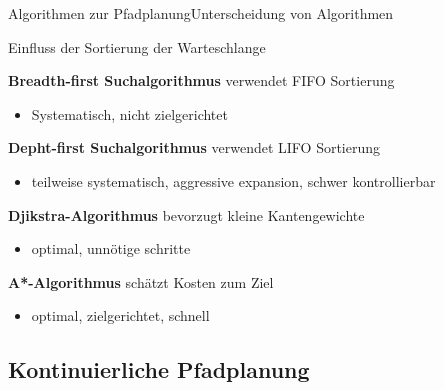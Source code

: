 \documentclass[t,aspectratio=169,dvipsnames]{beamer}
\begin{document}
\begin{frame}{Algorithmen zur Pfadplanung}{Unterscheidung von Algorithmen}
	
	\begin{center}
		Einfluss der Sortierung der Warteschlange
	\end{center}
	
	\textbf{Breadth-first Suchalgorithmus} verwendet FIFO Sortierung
	\begin{itemize}
		\item Systematisch, nicht zielgerichtet	
	\end{itemize}
	\textbf{Depht-first Suchalgorithmus} verwendet LIFO Sortierung
	\begin{itemize}
	\item teilweise systematisch, aggressive expansion, schwer kontrollierbar	
	\end{itemize}
	\textbf{Djikstra-Algorithmus} bevorzugt kleine Kantengewichte
	\begin{itemize}
		\item optimal, unnötige schritte
	\end{itemize}
	\textbf{A*-Algorithmus} schätzt Kosten zum Ziel
	\begin{itemize}
		\item optimal, zielgerichtet, schnell
	\end{itemize}	
\end{frame}

\subsection{Kontinuierliche Pfadplanung}
\end{document}
